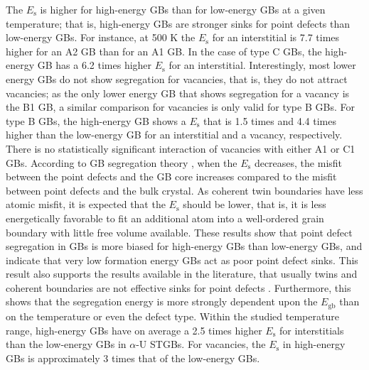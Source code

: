 \documentclass[review]{elsarticle}
\begin{document}
The $E_{\mathrm{s}}$ is higher for high-energy GBs than for low-energy GBs at a given temperature; that is, high-energy GBs are stronger sinks for point defects than low-energy GBs. For instance, at 500 K the $E_{\mathrm{s}}$ for an interstitial is 7.7 times higher for an A2 GB than for an A1 GB. In the case of type C GBs, the high-energy GB has a 6.2 times higher $E_{\mathrm{s}}$ for an interstitial. Interestingly, most lower energy GBs do not show segregation for vacancies, that is, they do not attract vacancies; as the only lower energy GB that shows segregation for a vacancy is the B1 GB, a similar comparison for vacancies is only valid for type B GBs. For type B GBs, the high-energy GB shows a $E_{\mathrm{s}}$ that is 1.5 times and 4.4 times higher than the low-energy GB for an interstitial and a vacancy, respectively. There is no statistically significant interaction of vacancies with either A1 or C1 GBs. According to GB segregation theory \cite{MISHIN_gb_diff}, when the $E_{\mathrm{s}}$ decreases, the misfit between the point defects and the GB core increases compared to the misfit between point defects and the bulk crystal. As coherent twin boundaries have less atomic misfit, it is expected that the $E_{\mathrm{s}}$ should be lower, that is, it is less energetically favorable to fit an additional atom into a well-ordered grain boundary with little free volume available. These results show that point defect segregation in GBs is more biased for high-energy GBs than low-energy GBs, and indicate that very low formation energy GBs act as poor point defect sinks. This result also supports the results available in the literature, that usually twins and coherent boundaries are not effective sinks for point defects \cite{Nabarro}. Furthermore, this shows that the segregation energy is more strongly dependent upon the  $E_{\mathrm{gb}}$  than on the temperature or even the defect type. Within the studied temperature range, high-energy GBs have on average a 2.5 times higher $E_{\mathrm{s}}$ for interstitials than the low-energy GBs in $\alpha$-U STGBs. For vacancies, the $E_{\mathrm{s}}$ in high-energy GBs is approximately 3 times that of the low-energy GBs.
\end{document}
